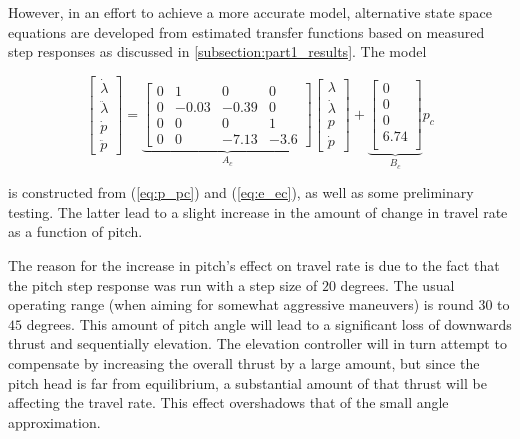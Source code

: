 However, in an effort to achieve a more accurate model, alternative state space equations are developed from estimated transfer functions based on measured step responses as discussed in \ref{subsection:part1_results}. The model

\begin{equation}
	\begin{bmatrix}
		\dot{\lambda}\\
		\ddot{\lambda}\\
		\dot{p}\\
		\ddot{p}
	\end{bmatrix} = 
	\underbrace{
	\begin{bmatrix}
		0 & 1 & 0 & 0 \\
		0 & -0.03 & -0.39 & 0 \\
		0 & 0 & 0 & 1 \\
		0 & 0 & -7.13 & -3.6
	\end{bmatrix}}_{A_c}
	\begin{bmatrix}
		\lambda	\\
		\dot{\lambda}		\\
		p		\\
		\dot{p}
	\end{bmatrix} +
	\underbrace{
	\begin{bmatrix}
		0 \\
		0 \\
		0 \\
		6.74 \\
	\end{bmatrix}}_{B_c}
	p_c
	\label{eq:sys}
\end{equation}

is constructed from (\ref{eq:p_pc}) and (\ref{eq:e_ec}), as well as some preliminary testing. The latter lead to a slight increase in the amount of change in travel rate as a function of pitch.

The reason for the increase in pitch's effect on travel rate is due to the fact that the pitch step response was run with a step size of $20$ degrees. The usual operating range (when aiming for somewhat aggressive maneuvers) is round $30$ to $45$ degrees. This amount of pitch angle will lead to a significant loss of downwards thrust and sequentially elevation. The elevation controller will in turn attempt to compensate by increasing the overall thrust by a large amount, but since the pitch head is far from equilibrium, a substantial amount of that thrust will be affecting the travel rate. This effect overshadows that of the small angle approximation.


